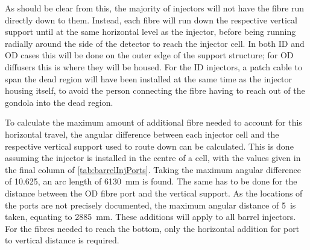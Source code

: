 \documentclass[a4paper,11pt]{article}
\begin{document}
As should be clear from this, the majority of injectors will not have the fibre run directly down to them. Instead, each fibre will run down the respective vertical support until at the same horizontal level as the injector, before being running radially around the side of the detector to reach the injector cell. In both ID and OD cases this will be done on the outer edge of the support structure; for OD diffusers this is where they will be housed. For the ID injectors, a patch cable to span the dead region will have been installed at the same time as the injector housing itself, to avoid the person connecting the fibre having to reach out of the gondola into the dead region.

To calculate the maximum amount of additional fibre needed to account for this horizontal travel, the angular difference between each injector cell and the respective vertical support used to route down can be calculated. This is done assuming the injector is installed in the centre of a cell, with the values given in the final column of \cref{tab:barrelInjPorts}. Taking the maximum angular difference of 10.625\degree, an arc length of 6130~mm is found. The same has to be done for the distance between the OD fibre port and the vertical support. As the locations of the ports are not precisely documented, the maximum angular distance of 5\degree\ is taken, equating to 2885~mm. These additions will apply to all barrel injectors. For the fibres needed to reach the bottom, only the horizontal addition for port to vertical distance is required.
\end{document}
